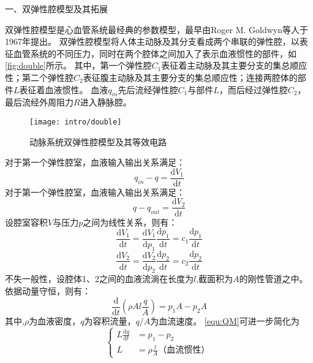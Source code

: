 一、双弹性腔模型及其拓展

双弹性腔模型是心血管系统最经典的参数模型，最早由Roger M. Goldwyn等人\cite{Goldwyn1967}于1967年提出。
双弹性腔模型将人体主动脉及其分支看成两个串联的弹性腔，以表征血管系统的不同压力，同时在两个腔体之间加入了表示血液惯性的部件，如\autoref{fig:double}所示。
其中，第一个弹性腔$C_{1}$表征着主动脉及其主要分支的集总顺应性；第二个弹性腔$C_{2}$表征腹主动脉及其主要分支的集总顺应性；连接两腔体的部件$L$表征着血液惯性。
血液$q_{in}$先后流经弹性腔$C_{1}$与部件$L$，而后经过弹性腔$C_{2}$，最后流经外周阻力$R$进入静脉腔。
\begin{figure}[htbp]
    \centering
    \texttt{[image: intro/double]}
    \caption{\label{fig:double}动脉系统双弹性腔模型及其等效电路}
\end{figure}

对于第一个弹性腔室，血液输入输出关系满足：
\begin{equation}
    \label{equ:QS1}
    q_{in}-q=\frac{\mathrm{d} V_{1}}{\mathrm{d} t}
\end{equation}
对于第一个弹性腔室，血液输入输出关系满足：
\begin{equation}
    \label{equ:QS2}
    q-q_{out}=\frac{\mathrm{d} V_{2}}{\mathrm{d} t}
\end{equation}
设腔室容积$V$与压力$p$之间为线性关系，则有：
\begin{equation}
    \label{equ:QSV1}
    \frac{\mathrm{d} V_{1}}{\mathrm{d} t}
    =\frac{\mathrm{d} V_{1}}{\mathrm{d} p_{1}}\frac{\mathrm{d} p_{1}}{\mathrm{d} t}
    =c_{1}\frac{\mathrm{d} p_{1}}{\mathrm{d} t}
\end{equation}
\begin{equation}
    \label{equ:QSV2}
    \frac{\mathrm{d} V_{2}}{\mathrm{d} t}
    =\frac{\mathrm{d} V_{2}}{\mathrm{d} p_{2}}\frac{\mathrm{d} p_{2}}{\mathrm{d} t}
    =c_{2}\frac{\mathrm{d} p_{2}}{\mathrm{d} t}
\end{equation}
不失一般性，设腔体1、2之间的血液流淌在长度为$l$,截面积为$A$的刚性管道之中。依据动量守恒，则有：
\begin{equation}
    \label{equ:QM}
    \frac{\mathrm{d}}{\mathrm{d} t}\left ( \rho Al\frac{q}{A} \right )=p_{1}A-p_{2}A
\end{equation}
其中,$\rho$为血液密度，$q$为容积流量，$q/A$为血流速度。
\autoref{equ:QM}可进一步简化为
\begin{equation}
    \left \{
    \begin{aligned}
        L\frac{\mathrm{d} q}{\mathrm{d} t} &= p_{1}-p_{2} \\
        L &=\rho \frac{l}{A} \text{（血流惯性）}
    \end{aligned}
    \right.
\end{equation}
